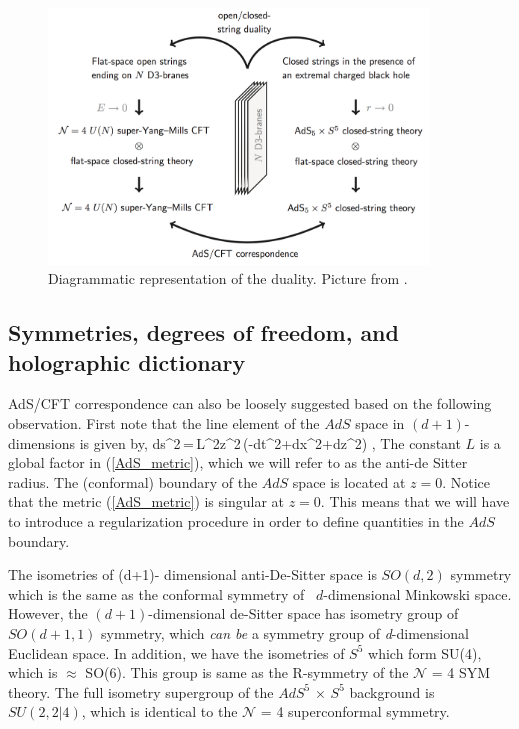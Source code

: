 \begin{figure}[h!]
\label{fig:AdS1} 
  \centering
      \includegraphics[width=0.9\textwidth]{./Figures/ads22.jpg}
  \caption{\label{fig:AdS1}Diagrammatic representation of the duality. Picture from \cite{ZEA}.}
\end{figure}



\subsection{Symmetries, degrees of freedom, and holographic dictionary} 

AdS/CFT correspondence can also be loosely suggested based on the following observation. First note that 
the line element of the $AdS$ space  in $(d+1)$-dimensions is given by, 
\beq
ds^2\,=\,{L^2\over z^2}\,(-dt^2+d\vec x^2+dz^2)\,\,,
\label{AdS_metric}
\eeq
The constant $L$ is a global factor in (\ref{AdS_metric}), which we will refer to as the anti-de Sitter radius. 
The (conformal) boundary of the $AdS$ space is located at $z=0$. Notice that the metric (\ref{AdS_metric}) is singular at $z=0$. 
This means that  we will have to introduce a regularization procedure in order to define quantities in the $AdS$ boundary.


The isometries of (d+1)- dimensional anti-De-Sitter space is $SO(d,2)$ symmetry which is the same as the conformal symmetry of \
$d$-dimensional Minkowski space. However, the $(d+1)$-dimensional de-Sitter space has isometry group of $SO(d+1,1)$ symmetry, 
which \textit{can be} a symmetry group of \textit{d}-dimensional Euclidean space.  In addition, we have the isometries of $S^{5}$ 
which form SU(4), which is $\approx$ SO(6). This group is same as the R-symmetry of the $\mathcal{N}$ = 4 SYM theory. The full isometry supergroup
of the $AdS^{5}$ $\times$ $S^{5}$ background is $SU(2, 2|4)$, which is identical to the $\mathcal{N}$ = 4 superconformal symmetry.

